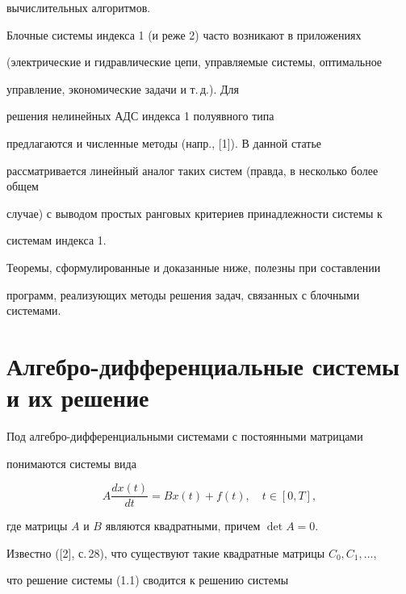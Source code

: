вычислительных алгоритмов. 


 


Блочные системы индекса 1 (и реже 2) часто возникают в приложениях 


(электрические и гидравлические цепи, управляемые системы, оптимальное 


управление, экономические задачи и т.\,д.). Для 


решения нелинейных АДС индекса 1 полуявного типа 


предлагаются и численные методы (напр., [1]). В данной статье 


рассматривается линейный аналог таких систем (правда, в несколько более общем 


случае) с выводом простых ранговых критериев принадлежности системы к 


системам индекса 1. 


 


Теоремы, сформулированные и доказанные ниже, полезны при составлении 


программ, реализующих методы решения задач, связанных с блочными системами. 


 


 


\section{Алгебро-дифференциальные системы и их решение} 


 


Под алгебро-дифференциальными системами с постоянными матрицами 


понимаются системы вида 


\begin{equation} 


A\frac{dx(t)}{dt}=Bx(t)+f(t),\quad t\in[0,T], 


\end{equation} 


где матрицы $A$ и $B$ являются квадратными, причем $\det A=0$. 


 


Известно ([2], с.\,28), что существуют такие квадратные матрицы $C_0,C_1,\dotsc$, 


что решение системы (1.1) сводится к решению системы 



